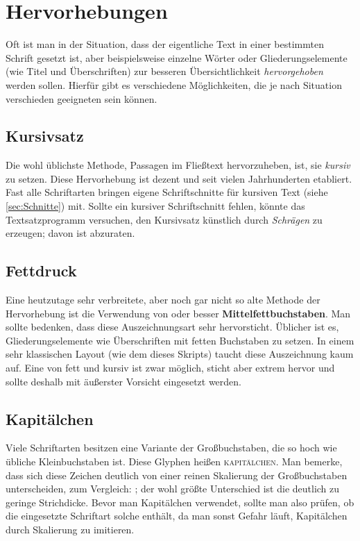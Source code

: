 \chapter{Hervorhebungen}

Oft ist man in der Situation, dass der eigentliche Text in einer bestimmten
Schrift gesetzt ist, aber beispielsweise einzelne Wörter oder
Gliederungselemente (wie Titel und Überschriften) zur besseren Übersichtlichkeit
\emph{hervorgehoben} werden sollen. Hierfür gibt es verschiedene Möglichkeiten, die
je nach Situation verschieden geeigneten sein können.

\section{Kursivsatz}

Die wohl üblichste Methode, Passagen im Fließtext hervorzuheben, ist, sie
\emph{kursiv} zu setzen. Diese Hervorhebung ist dezent und seit vielen
Jahrhunderten etabliert. Fast alle Schriftarten bringen eigene Schriftschnitte
für kursiven Text (siehe \cref{sec:Schnitte}) mit. Sollte ein kursiver
Schriftschnitt fehlen, könnte das Textsatzprogramm versuchen, den Kursivsatz
künstlich durch \textsl{Schrägen} zu erzeugen; davon ist abzuraten.

\section{Fettdruck}

Eine heutzutage sehr verbreitete, aber noch gar nicht so alte Methode der
Hervorhebung ist die Verwendung von {\selectfont {Fett-}} oder
besser \textbf{Mittelfettbuchstaben}. Man sollte bedenken, dass diese
Auszeichnungsart sehr hervorsticht. Üblicher ist es, Gliederungselemente wie
Überschriften mit fetten Buchstaben zu setzen. In einem sehr klassischen Layout
(wie dem dieses Skripts) taucht diese Auszeichnung kaum auf. Eine
\emph{{\selectfont{Kombination}}} von fett und kursiv ist zwar
möglich, sticht aber extrem hervor und sollte deshalb mit äußerster Vorsicht
eingesetzt werden.

\section{Kapitälchen}

Viele Schriftarten besitzen eine Variante der Großbuchstaben, die so hoch wie
übliche Kleinbuchstaben ist. Diese Glyphen heißen \textsc{kapitälchen}. Man
bemerke, dass sich diese Zeichen deutlich von einer reinen Skalierung der
Großbuchstaben unterscheiden, zum Vergleich: ; der
wohl größte Unterschied ist die deutlich zu geringe Strichdicke. Bevor man
Kapitälchen verwendet, sollte man also prüfen, ob die eingesetzte Schriftart
solche enthält, da man sonst Gefahr läuft, Kapitälchen durch Skalierung zu
imitieren.

